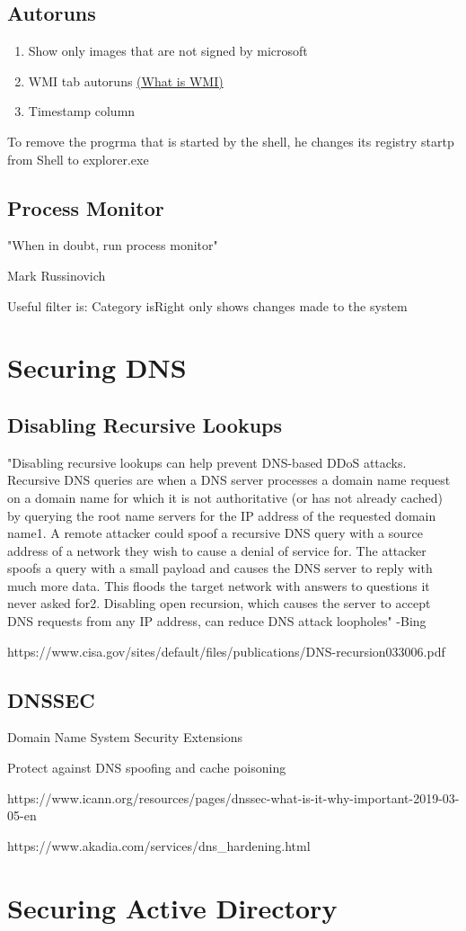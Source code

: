 \documentclass{article}
\begin{document}
\subsection{Autoruns}

\begin{enumerate}
        \item Show only images that are not signed by microsoft
        \item WMI tab autoruns \href{https://medium.com/threatpunter/detecting-removing-wmi-persistence-60ccbb7dff96}{(What is WMI)}
        \item Timestamp column
\end{enumerate}

To remove the progrma that is started by the shell, he changes its registry startp from 
Shell to explorer.exe

\subsection{Process Monitor}
\epigraph{"When in doubt, run process monitor"}{Mark Russinovich}

Useful filter is:
Category isRight only shows changes made to the system


\section{Securing DNS}

\subsection{Disabling Recursive Lookups}
"Disabling recursive lookups can help prevent DNS-based DDoS attacks. 
Recursive DNS queries are when a DNS server processes a domain name 
request on a domain name for which it is not authoritative 
(or has not already cached) by querying the root name servers for 
the IP address of the requested domain name1. A remote attacker could 
spoof a recursive DNS query with a source address of a network they 
wish to cause a denial of service for. The attacker spoofs a query 
with a small payload and causes the DNS server to reply with much 
more data. This floods the target network with answers to questions 
it never asked for2. Disabling open recursion, which causes the server 
to accept DNS 
requests from any IP address, can reduce DNS attack loopholes" -Bing

https://www.cisa.gov/sites/default/files/publications/DNS-recursion033006.pdf

\subsection{DNSSEC}
Domain Name System Security Extensions

Protect against DNS spoofing and cache poisoning

https://www.icann.org/resources/pages/dnssec-what-is-it-why-important-2019-03-05-en

https://www.akadia.com/services/dns\_hardening.html

\section{Securing Active Directory}
\end{document}
